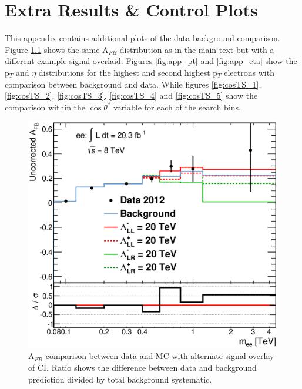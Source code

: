 \chapter{Extra Results \& Control Plots}
	\label{ap:contol}

	This appendix contains additional plots of the data background comparison. Figure \ref{fig:afb_alt} shows the same A$_{FB}$ distribution as in the main text but with a different example signal overlaid. Figures \ref{fig:app_pt} and \ref{fig:app_eta} show the p$_{T}$ and $\eta$ distributions for the highest and second highest p$_{T}$ electrons with comparison between background and data. While figures \ref{fig:cosTS_1}, \ref{fig:cosTS_2}, \ref{fig:cosTS_3}, \ref{fig:cosTS_4} and \ref{fig:cosTS_5} show the comparison within the $\cos{\theta^{*}}$ variable for each of the search bins.


	\begin{figure}[ht]
		\centering
			\includegraphics[width=0.98\linewidth]{images/AFB_main_alt.eps}
		\caption{A$_{FB}$ comparison between data and MC with alternate signal overlay of CI. Ratio shows the difference between data and background prediction divided by total background systematic.}
		\label{fig:afb_alt}
	\end{figure}








